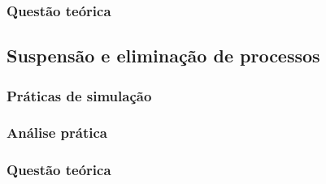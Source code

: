 \documentclass[a4paper,12pt]{article} %
\begin{document}
\subsubsection[]{Questão teórica}

\subsection[]{Suspensão e eliminação de processos}
\subsubsection[]{Práticas de simulação}
\subsubsection[]{Análise prática}
\subsubsection[]{Questão teórica}


\clearpage
\printbibliography
\end{document}
